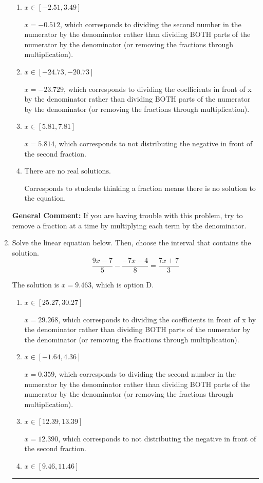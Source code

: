 \documentclass{extbook}[14pt]
\newcommand{\litem}[1]{\item #1

\rule{\textwidth}{0.4pt}}
\begin{document}
\begin{enumerate}
{\begin{enumerate}[label=\Alph*.]
* $x = -4.864$, which is the correct option.
\item \( x \in [-2.51, 3.49] \)

 $x = -0.512$, which corresponds to dividing the second number in the numerator by the denominator rather than dividing BOTH parts of the numerator by the denominator (or removing the fractions through multiplication).
\item \( x \in [-24.73, -20.73] \)

 $x = -23.729$, which corresponds to dividing the coefficients in front of x by the denominator rather than dividing BOTH parts of the numerator by the denominator (or removing the fractions through multiplication).
\item \( x \in [5.81, 7.81] \)

 $x = 5.814$, which corresponds to not distributing the negative in front of the second fraction.
\item \( \text{There are no real solutions.} \)

Corresponds to students thinking a fraction means there is no solution to the equation.
\end{enumerate}

\textbf{General Comment:} If you are having trouble with this problem, try to remove a fraction at a time by multiplying each term by the denominator.
}
\litem{
Solve the linear equation below. Then, choose the interval that contains the solution.
\[ \frac{9x -7}{5} - \frac{-7x -4}{8} = \frac{7x + 7}{3} \]

The solution is \( x = 9.463 \), which is option D.\begin{enumerate}[label=\Alph*.]
\item \( x \in [25.27, 30.27] \)

 $x = 29.268$, which corresponds to dividing the coefficients in front of x by the denominator rather than dividing BOTH parts of the numerator by the denominator (or removing the fractions through multiplication).
\item \( x \in [-1.64, 4.36] \)

 $x = 0.359$, which corresponds to dividing the second number in the numerator by the denominator rather than dividing BOTH parts of the numerator by the denominator (or removing the fractions through multiplication).
\item \( x \in [12.39, 13.39] \)

 $x = 12.390$, which corresponds to not distributing the negative in front of the second fraction.
\item \( x \in [9.46, 11.46] \)


\end{enumerate}}
\end{enumerate}
\end{document}
